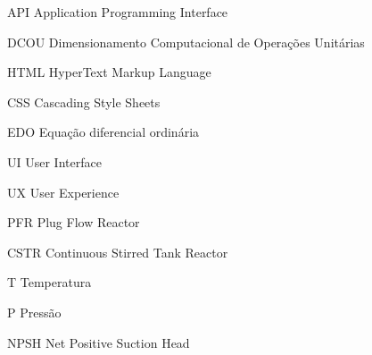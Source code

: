 \documentclass[
	12pt,				%
	openright,			%
	twoside,			%
	a4paper,			%
	english,			%
	brazil				%
	]{abntex2}
\begin{document}

\listoffigures*
\cleardoublepage

\listoftables*
\cleardoublepage

\begin{siglas}
  \item[API] Application Programming Interface
  \item[DCOU] Dimensionamento Computacional de Operações Unitárias
  \item[HTML] HyperText Markup Language
  \item[CSS] Cascading Style Sheets
  \item[EDO] Equação diferencial ordinária
  \item[UI] User Interface
  \item[UX] User Experience
  \item[PFR] Plug Flow Reactor
  \item[CSTR] Continuous Stirred Tank Reactor
  \item[T] Temperatura
  \item[P] Pressão
  \item[NPSH] Net Positive Suction Head
\end{siglas}
\cleardoublepage

\tableofcontents*
\cleardoublepage


\hypersetup{pageanchor=true}
\textual



\let\origcleardoublepage\cleardoublepage
\let\origcleartorecto\cleartorecto
\let\cleardoublepage\clearpage
\let\cleartorecto\clearpage

\let\cleardoublepage\origcleardoublepage
\let\cleartorecto\origcleartorecto





\postextual


\end{document}
